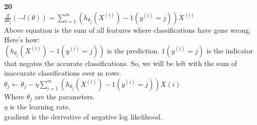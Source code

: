 \documentclass{article}
\begin{document}
\textbf{20}\bigskip \\
$\frac{d}{d\theta_j}(-l(\theta)) = \sum_{i=1}^{m}(h_{\theta_j}(X^{(i)})-1(y^{(i)}=j))X^{(i)}$\smallskip \\
Above equation is the sum of all features where classifications have gone wrong. Here's how:\smallskip \\
$(h_{\theta_j}(X^{(i)})-1(y^{(i)}=j))$ is the prediction. $1(y^{(i)}=j)$ is the indicator that negates the accurate classifications. So, we will be left with the sum of inaccurate classifications over m rows.\smallskip \\
$\theta_{j} \gets \theta_{j}-\eta\sum_{i=1}^{m}(h_{\theta_j}(X^{(i)})-1(y^{(i)}=j))X{(i)}$ \smallskip \\
Where $\theta_j$ are the parameters.\\
$\eta$ is the learning rate.\\
gradient is the derivative of negative log likelihood.\bigskip \\
\end{document}
